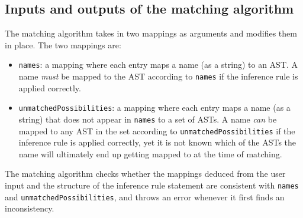\subsection{Inputs and outputs of the matching algorithm}
The matching algorithm takes in two mappings as arguments and modifies them in place. The two mappings are:
\begin{itemize}
    \item \lstinline{names}: a mapping where each entry maps a name (as a string) to an AST. A name \textit{must} be mapped to the AST according to \lstinline{names} if the inference rule is applied correctly.
    \item \lstinline{unmatchedPossibilities}: a mapping where each entry maps a name (as a string) that does not appear in \lstinline{names} to a set of ASTs. A name \textit{can} be mapped to any AST in the set according to \lstinline{unmatchedPossibilities} if the inference rule is applied correctly, yet it is not known which of the ASTs the name will ultimately end up getting mapped to at the time of matching.
\end{itemize}
The matching algorithm checks whether the mappings deduced from the user input and the structure of the inference rule statement are consistent with \lstinline{names} and \lstinline{unmatchedPossibilities}, and throws an error whenever it first finds an inconsistency.

